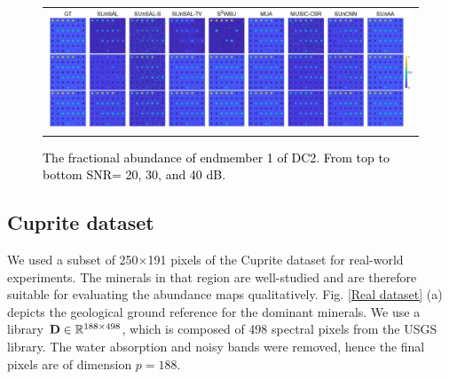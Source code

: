 \begin{table}[h]
\centering
\caption{Sparse unmixing experiments applied to DC2 in terms of SRE. The best performances are shown in bold. The second best are underlined.}
	\label{tab:SRE_DC2}
\end{table}




\begin{figure} [h]\begin{center}
\begin{tabular}{c} 
\includegraphics[width=\textwidth]{fichiers_latex/Chap3/figs/DC2_2nd_HAL.pdf}\\
 \end{tabular} \end{center} \caption{\textcolor{black}{The fractional abundance of endmember 1 of DC2. From top to bottom SNR= 20, 30, and 40 dB.}}
 \label{DC2}
\end{figure}


\subsection{Cuprite dataset}

We used a subset of 250$\times$191 pixels of the Cuprite dataset for real-world experiments. The minerals in that region are well-studied and are therefore suitable for evaluating the abundance maps qualitatively. Fig. \ref{Real dataset} (a) depicts the geological ground reference for the dominant minerals. We use a library $\mathbf D \in \mathbb{R}^{188\times 498}$, which is composed of 498 spectral pixels from the USGS library. The water absorption and noisy bands were removed, hence the final pixels are of dimension $p=188$.

